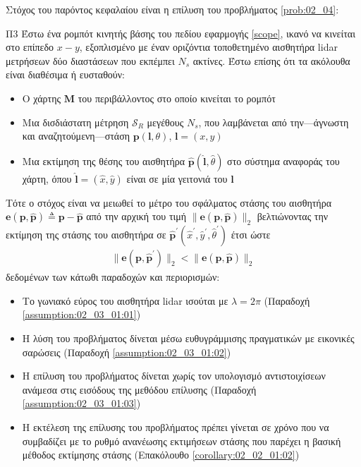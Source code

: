 Στόχος του παρόντος κεφαλαίου είναι η επίλυση του προβλήματος \ref{prob:02_04}:

\begin{bw_box}
\begin{customproblem}{Π3}
  \label{prob:02_04}
  Έστω ένα ρομπότ κινητής βάσης του πεδίου εφαρμογής \ref{scope}, ικανό να
  κινείται στο επίπεδο $x-y$, εξοπλισμένο με έναν οριζόντια τοποθετημένο
  αισθητήρα lidar μετρήσεων δύο διαστάσεων που εκπέμπει $N_s$ ακτίνες. Έστω
  επίσης ότι τα ακόλουθα είναι διαθέσιμα ή ευσταθούν:
  \begin{itemize}
    \item Ο χάρτης $\bm{M}$ του περιβάλλοντος στο οποίο κινείται το ρομπότ
    \item Μια δισδιάστατη μέτρηση $\mathcal{S}_R$ μεγέθους $N_s$, που λαμβάνεται
          από την---άγνωστη και αναζητούμενη---στάση $\bm{p}(\bm{l},\theta)$,
          $\bm{l} = (x,y)$
    \item Μια εκτίμηση της θέσης του αισθητήρα
          $\hat{\bm{p}}(\hat{\bm{l}}, \hat{\theta})$ στο σύστημα αναφοράς του
          χάρτη, όπου $\hat{\bm{l}} = (\hat{x}, \hat{y})$ είναι σε μία γειτονιά
          του $\bm{l}$
  \end{itemize}
\end{customproblem}
Τότε ο στόχος είναι να μειωθεί το μέτρο του σφάλματος στάσης του αισθητήρα
$\bm{e}(\bm{p}, \hat{\bm{p}}) \triangleq \bm{p}- \hat{\bm{p}}$ από την αρχική
του τιμή $\|\bm{e}(\bm{p}, \hat{\bm{p}})\|_2$
βελτιώνοντας την εκτίμηση της στάσης του αισθητήρα σε
$\hat{\bm{p}}^\prime(\hat{x}^\prime, \hat{y}^\prime, \hat{\theta}^\prime)$
έτσι ώστε
\begin{align}
  \|\bm{e}(\bm{p}, \hat{\bm{p}}^\prime)\|_2 < \|\bm{e}(\bm{p}, \hat{\bm{p}})\|_2
  \tag{$\astt$}
  \label{objective:02_04}
\end{align}
δεδομένων των κάτωθι παραδοχών και περιορισμών:
\begin{itemize}
  \item Το γωνιακό εύρος του αισθητήρα lidar ισούται με $\lambda = 2\pi$
        (Παραδοχή \ref{assumption:02_03_01:01})
  \item Η λύση του προβλήματος δίνεται μέσω ευθυγράμμισης πραγματικών με εικονικές
        σαρώσεις (Παραδοχή \ref{assumption:02_03_01:02})
  \item Η επίλυση του προβλήματος δίνεται χωρίς τον υπολογισμό αντιστοιχίσεων
        ανάμεσα στις εισόδους της μεθόδου επίλυσης (Παραδοχή
        \ref{assumption:02_03_01:03})
  \item Η εκτέλεση της επίλυσης του προβλήματος πρέπει γίνεται σε χρόνο που να
        συμβαδίζει με το ρυθμό ανανέωσης εκτιμήσεων στάσης που παρέχει η βασική
        μέθοδος εκτίμησης στάσης (Επακόλουθο \ref{corollary:02_02_01:02})
\end{itemize}

\end{bw_box}


